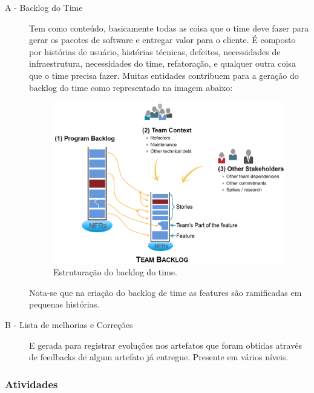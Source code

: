 \begin{description}
  \item[A - Backlog do Time]
  Tem como conteúdo, basicamente todas as coisa que o time deve fazer para gerar
  os pacotes de software e entregar valor para o cliente. É composto por histórias
  de usuário, histórias técnicas, defeitos, necessidades de infraestrutura, necessidades
  do time, refatoração, e qualquer outra coisa que o time precisa fazer. Muitas entidades
  contribuem para a geração do backlog do time como representado na imagem abaixo:

  \begin{figure}[H]
      \centering
    \includegraphics[keepaspectratio=true,scale=0.3]{figuras/TeamBacklog.eps}
      \caption{Estruturação do backlog do time.}
      \label{fig:backlog}
  \end{figure}

  Nota-se que na criação do backlog de time as features são ramificadas em pequenas histórias.


  \item[B - Lista de melhorias e Correções]
   E gerada para registrar evoluções nos artefatos que foram obtidas através de feedbacks
  de algum artefato já entregue. Presente em vários níveis.

\end{description}


  \subsubsection{Atividades}

